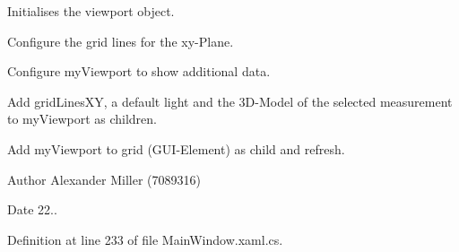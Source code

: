 Initialises the viewport object. 


\begin{DoxyEnumerate}
\item Configure the grid lines for the xy-\/\+Plane.
\item Configure my\+Viewport to show additional data.
\item Add grid\+Lines\+XY, a default light and the 3\+D-\/\+Model of the selected measurement to my\+Viewport as children.
\item Add my\+Viewport to grid (G\+U\+I-\/\+Element) as child and refresh.
\end{DoxyEnumerate}

\begin{DoxyAuthor}{Author}
Alexander Miller (7089316) 
\end{DoxyAuthor}
\begin{DoxyDate}{Date}
22.. 
\end{DoxyDate}


Definition at line 233 of file Main\+Window.\+xaml.\+cs.


